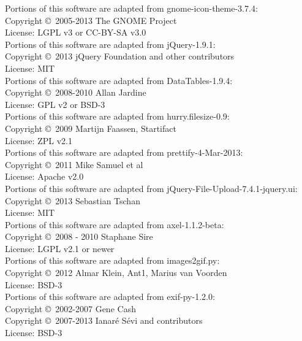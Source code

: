 \documentclass[10pt]{article}
\begin{document}
\noindent Portions of this software are adapted from gnome-icon-theme-3.7.4: \\
Copyright \copyright\ 2005-2013 The GNOME Project \\
License: LGPL v3 or CC-BY-SA v3.0 \\

\noindent Portions of this software are adapted from jQuery-1.9.1: \\
Copyright \copyright\ 2013 jQuery Foundation and other contributors \\
License: MIT \\

\noindent Portions of this software are adapted from DataTables-1.9.4: \\
Copyright \copyright\ 2008-2010 Allan Jardine \\
License: GPL v2 or BSD-3 \\

\noindent Portions of this software are adapted from hurry.filesize-0.9: \\
Copyright \copyright\ 2009 Martijn Faassen, Startifact \\
License: ZPL v2.1 \\

\noindent Portions of this software are adapted from prettify-4-Mar-2013: \\
Copyright \copyright\ 2011 Mike Samuel et al \\
License: Apache v2.0 \\

\noindent Portions of this software are adapted from jQuery-File-Upload-7.4.1-jquery.ui: \\
Copyright \copyright\ 2013 Sebastian Tschan \\
License: MIT \\

\noindent Portions of this software are adapted from axel-1.1.2-beta: \\
Copyright \copyright\ 2008 - 2010 Staphane Sire \\
License: LGPL v2.1 or newer \\

\noindent Portions of this software are adapted from images2gif.py: \\
Copyright \copyright\ 2012 Almar Klein, Ant1, Marius van Voorden \\
License: BSD-3 \\

\noindent Portions of this software are adapted from exif-py-1.2.0: \\
Copyright \copyright\ 2002-2007 Gene Cash \\
Copyright \copyright\ 2007-2013 Ianaré Sévi and contributors \\
License: BSD-3 \\
\end{document}
